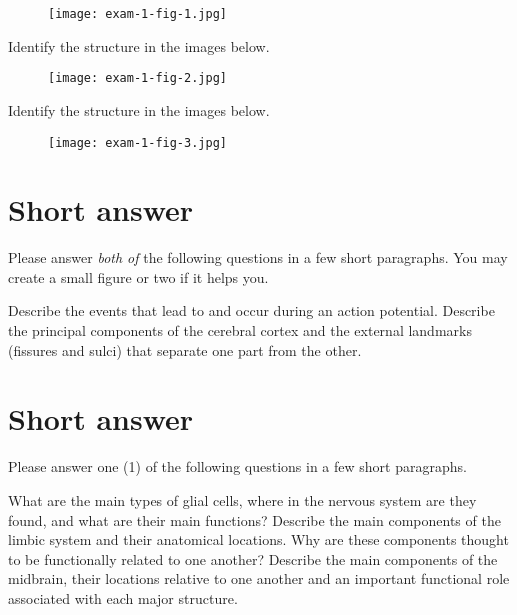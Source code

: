 \documentclass[]{exam}
\begin{document}
\begin{questions}
\begin{figure}[h]
\texttt{[image: exam-1-fig-1.jpg]}
\centering
\end{figure}

\question Identify the structure in the images below.

\begin{figure}[h]
\texttt{[image: exam-1-fig-2.jpg]}
\centering
\end{figure}

\question Identify the structure in the images below.

\begin{figure}[h]
\texttt{[image: exam-1-fig-3.jpg]}
\centering
\end{figure}

\newpage
\section{Short answer}

Please answer \emph{both of} the following questions in a few short paragraphs.  You may create a small figure or two if it helps you.

\question  Describe the events that lead to and occur during an action potential.
\vspace{2.5in}
\question  Describe the principal components of the cerebral cortex and the external landmarks (fissures and sulci) that separate one part from the other.
\vspace{2.5in}

\newpage
\section{Short answer}

Please answer one (1) of the following questions in a few short paragraphs.

\question  What are the main types of glial cells, where in the nervous system are they found, and what are their main functions?
\vspace{2.5in}
\question  Describe the main components of the limbic system and their anatomical locations.  Why are these components thought to be functionally related to one another?
\vspace{2.5in}
\question  Describe the main components of the midbrain, their locations relative to one another and an important functional role associated with each major structure.
\vspace{2.5in}


\end{questions}
\end{document}
